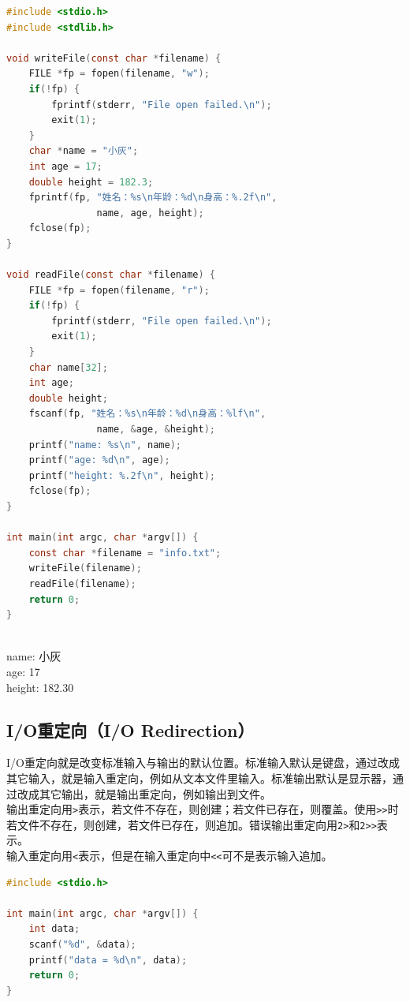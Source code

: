 \begin{lstlisting}[language=C, title=文件I/O]
#include <stdio.h>
#include <stdlib.h>

void writeFile(const char *filename) {
    FILE *fp = fopen(filename, "w");
    if(!fp) {
        fprintf(stderr, "File open failed.\n");
        exit(1);
    }
    char *name = "小灰";
    int age = 17;
    double height = 182.3;
    fprintf(fp, "姓名：%s\n年龄：%d\n身高：%.2f\n", 
                name, age, height);
    fclose(fp);
}

void readFile(const char *filename) {
    FILE *fp = fopen(filename, "r");
    if(!fp) {
        fprintf(stderr, "File open failed.\n");
        exit(1);
    }
    char name[32];
    int age;
    double height;
    fscanf(fp, "姓名：%s\n年龄：%d\n身高：%lf\n", 
                name, &age, &height);
    printf("name: %s\n", name);
    printf("age: %d\n", age);
    printf("height: %.2f\n", height);
    fclose(fp);
}

int main(int argc, char *argv[]) {
    const char *filename = "info.txt";
    writeFile(filename);
    readFile(filename);
    return 0;
}
\end{lstlisting}

\begin{tcolorbox}
	 \\
	name: 小灰 \\
	age: 17 \\
	height: 182.30
\end{tcolorbox}

\subsection{I/O重定向（I/O Redirection）}

I/O重定向就是改变标准输入与输出的默认位置。标准输入默认是键盘，通过改成其它输入，就是输入重定向，例如从文本文件里输入。标准输出默认是显示器，通过改成其它输出，就是输出重定向，例如输出到文件。 \\

输出重定向用\lstinline|>|表示，若文件不存在，则创建；若文件已存在，则覆盖。使用\lstinline|>>|时若文件不存在，则创建，若文件已存在，则追加。错误输出重定向用\lstinline|2>|和\lstinline|2>>|表示。 \\

输入重定向用\lstinline|<|表示，但是在输入重定向中\lstinline|<<|可不是表示输入追加。

\begin{lstlisting}[language=C, title=I/O重定向]
#include <stdio.h>

int main(int argc, char *argv[]) {
    int data;
    scanf("%d", &data);
    printf("data = %d\n", data);
    return 0;
}
\end{lstlisting}

